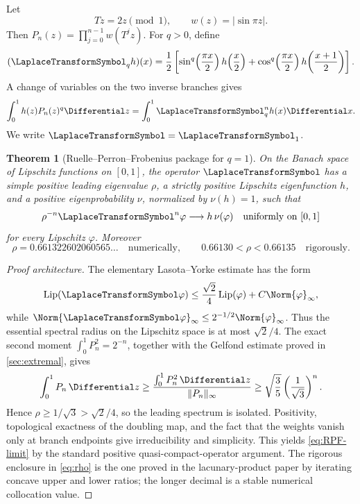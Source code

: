 \documentclass[11pt,oneside]{article}
\newtheorem{theorem}{Theorem}[section]
\theoremstyle{definition}
\theoremstyle{remark}
\newcommand{\Lip}{\operatorname{Lip}}
\newcommand{\T}{T}
\begin{document}
Let
\[
 \T z=2z\pmod1,
 \qquad w(z)=|\sin\pi z|.
\]
Then \(P_n(z)=\prod_{j=0}^{n-1}w(\T^jz)\).  For \(q>0\), define
\begin{equation}
 (\LaplaceTransformSymbol_qh)(x)=\frac12\left[
  \sin^q\!\left(\frac{\pi x}{2}\right)h\!\left(\frac x2\right)
 +\cos^q\!\left(\frac{\pi x}{2}\right)h\!\left(\frac{x+1}{2}\right)
 \right].
 \label{eq:Lq}
\end{equation}
A change of variables on the two inverse branches gives
\begin{equation}
 \int_0^1 h(z)P_n(z)^q\Differential z
 =\int_0^1\LaplaceTransformSymbol_q^n h(x)\Differential x.
 \label{eq:transfer-identity}
\end{equation}
We write \(\LaplaceTransformSymbol=\LaplaceTransformSymbol_1\).

\begin{theorem}[Ruelle--Perron--Frobenius package for \(q=1\)]
\label{thm:RPF}
On the Banach space of Lipschitz functions on \([0,1]\), the operator
\(\LaplaceTransformSymbol\) has a simple positive leading eigenvalue \(\rho\), a strictly
positive Lipschitz eigenfunction \(h\), and a positive eigenprobability
\(\nu\), normalized by \(\nu(h)=1\), such that
\begin{equation}
 \rho^{-n}\LaplaceTransformSymbol^n\varphi
 \longrightarrow h\,\nu(\varphi)
 \quad\text{uniformly on }[0,1]
 \label{eq:RPF-limit}
\end{equation}
for every Lipschitz \(\varphi\).  Moreover
\begin{equation}
 \rho=0.661322602060565\ldots\quad\text{numerically},
 \qquad 0.66130<\rho<0.66135\quad\text{rigorously}.
 \label{eq:rho}
\end{equation}
\end{theorem}

\begin{proof}[Proof architecture]
The elementary Lasota--Yorke estimate has the form
\[
 \Lip(\LaplaceTransformSymbol\varphi)
 \le \frac{\sqrt2}{4}\Lip(\varphi)+C\Norm{\varphi}_\infty,
\]
while \(\Norm{\LaplaceTransformSymbol\varphi}_\infty\le2^{-1/2}\Norm{\varphi}_\infty\).
Thus the essential spectral radius on the Lipschitz space is at most
\(\sqrt2/4\).  The exact second moment \(\int_0^1P_n^2=2^{-n}\), together with the
Gelfond estimate proved in \cref{sec:extremal}, gives
\[
 \int_0^1P_n\,\Differential z
 \ge \frac{\int_0^1P_n^2\,\Differential z}{\lVert P_n\rVert_\infty}
 \ge \sqrt{\frac35}\left(\frac1{\sqrt3}\right)^n.
\]
Hence \(\rho\ge1/\sqrt3>\sqrt2/4\), so the leading spectrum is isolated.
Positivity, topological exactness of the doubling map, and the fact that the
weights vanish only at branch endpoints give irreducibility and simplicity.
This yields \eqref{eq:RPF-limit} by the standard positive
quasi-compact-operator argument.  The rigorous enclosure in
\eqref{eq:rho} is the one proved in the lacunary-product paper by iterating
concave upper and lower ratios; the longer decimal is a stable numerical
collocation value.
\end{proof}
\end{document}
